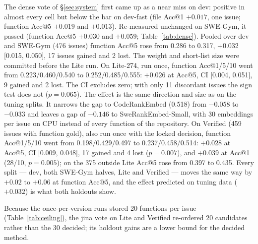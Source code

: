 \documentclass[10pt,twocolumn]{article}
\makeatletter
\newcommand{\accat}[1]{Acc@#1}
\makeatother
\begin{document}
The dense vote of \S\ref{sec:system} first came up as a near miss on dev: positive in almost every
cell but below the bar on dev-fast (file \accat{1} $+0.017$, one issue; function \accat{5} $+0.019$
and $+0.013$). Re-measured unchanged on SWE-Gym, it passed (function \accat{5} $+0.030$ and $+0.059$;
Table~\ref{tab:dense}). Pooled over dev and SWE-Gym (476 issues) function \accat{5} rose from 0.286
to 0.317, $+0.032$ [0.015, 0.050], 17 issues gained and 2 lost. The weight and short-list size were
committed before the Lite run. On Lite-274, run once, function \accat{1}/5/10 went from
0.223/0.460/0.540 to 0.252/0.485/0.555: $+0.026$ at \accat{5}, CI [0.004, 0.051], 9 gained and 2
lost. The CI excludes zero; with only 11 discordant issues the sign test does not ($p=0.065$). The
effect is the same direction and size as on the tuning splits. It narrows the gap to CodeRankEmbed
(0.518) from $-0.058$ to $-0.033$ and leaves a gap of $-0.146$ to SweRankEmbed-Small, with 30
embeddings per issue on CPU instead of every function of the repository. On Verified (459 issues
with function gold), also run once with the locked decision, function \accat{1}/5/10 went from
0.198/0.429/0.497 to 0.237/0.458/0.514: $+0.028$ at \accat{5}, CI [0.009, 0.048], 17 gained and 4
lost ($p=0.007$), and $+0.039$ at \accat{1} (28/10, $p=0.005$); on the 375 outside Lite \accat{5}
rose from 0.397 to 0.435. Every split --- dev, both SWE-Gym halves, Lite and Verified --- moves the
same way by $+0.02$ to $+0.06$ at function \accat{5}, and the effect predicted on tuning data
($+0.032$) is what both holdouts show.

Because the once-per-version runs stored 20 functions per issue (Table~\ref{tab:ceiling}), the
jina vote on Lite and Verified re-ordered 20 candidates rather than the 30 decided; its holdout gains
are a lower bound for the decided method.
\end{document}
